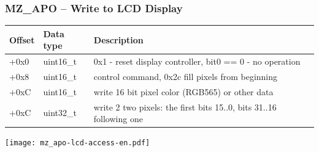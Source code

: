 \documentclass{beamer}
\begin{document}
\begin{frame}
\frametitle{MZ\_APO -- Write to LCD Display}

\begin{tabular}{|l|l|l|l|} \hline
Offset & \footnotesize{Data type} & Description \\\hline
+0x0 & \footnotesize{uint16\_t} & \footnotesize{0x1 - reset display controller, bit0 == 0 - no operation} \\\hline
+0x8 & \footnotesize{uint16\_t} & \footnotesize{control command, 0x2c fill pixels from beginning} \\\hline
+0xC & \footnotesize{uint16\_t} & \footnotesize{write 16 bit pixel color (RGB565) or other data} \\\hline
+0xC & \footnotesize{uint32\_t} & \footnotesize{write 2 two pixels: the first bits 15..0, bits 31..16 following one} \\\hline
\end{tabular}

\vspace{5mm}

\texttt{[image: mz\_apo-lcd-access-en.pdf]}

\end{frame}
\end{document}
